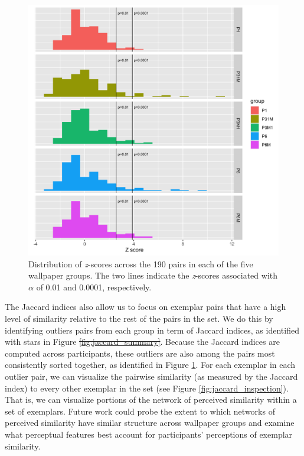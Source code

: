 \documentclass[11pt, twoside]{article}
\providecommand{\DIFaddtex}[1]{{\protect\color{blue}\uwave{#1}}} %
\providecommand{\DIFdeltex}[1]{{\protect\color{red}\sout{#1}}}                      %
\providecommand{\DIFaddbegin}{} %
\providecommand{\DIFaddend}{} %
\providecommand{\DIFdelbegin}{} %
\providecommand{\DIFdelend}{} %
\providecommand{\DIFadd}[1]{\texorpdfstring{\DIFaddtex{#1}}{#1}} %
\providecommand{\DIFdel}[1]{\texorpdfstring{\DIFdeltex{#1}}{}} %
\newcommand{\DIFscaledelfig}{0.5}
\newlength{\DIFdelgraphicswidth} %
\newlength{\DIFdelgraphicsheight} %
\newcommand{\DIFaddincludegraphics}[2][]{{\color{blue}\fbox{\DIFOincludegraphics[#1]{#2}}}} %
\newcommand{\DIFdelincludegraphics}[2][]{%
\sbox{\DIFdelgraphicsbox}{\DIFOincludegraphics[#1]{#2}}%
\settoboxwidth{\DIFdelgraphicswidth}{\DIFdelgraphicsbox} %
\settoboxtotalheight{\DIFdelgraphicsheight}{\DIFdelgraphicsbox} %
\scalebox{\DIFscaledelfig}{%
\parbox[b]{\DIFdelgraphicswidth}{\usebox{\DIFdelgraphicsbox}\\[-\baselineskip] \rule{\DIFdelgraphicswidth}{0em}}\llap{\resizebox{\DIFdelgraphicswidth}{\DIFdelgraphicsheight}{%
\setlength{\unitlength}{\DIFdelgraphicswidth}%
\begin{picture}(1,1)%
\thicklines\linethickness{2pt} %
{\color[rgb]{1,0,0}\put(0,0){\framebox(1,1){}}}%
{\color[rgb]{1,0,0}\put(0,0){\line( 1,1){1}}}%
{\color[rgb]{1,0,0}\put(0,1){\line(1,-1){1}}}%
\end{picture}%
}\hspace*{3pt}}} %
} %
\DeclareRobustCommand{\DIFaddbegin}{\DIFOaddbegin \let\includegraphics\DIFaddincludegraphics} %
\DeclareRobustCommand{\DIFaddend}{\DIFOaddend \let\includegraphics\DIFOincludegraphics} %
\DeclareRobustCommand{\DIFdelbegin}{\DIFOdelbegin \let\includegraphics\DIFdelincludegraphics} %
\DeclareRobustCommand{\DIFdelend}{\DIFOaddend \let\includegraphics\DIFOincludegraphics} %
\begin{document}
\begin{figure}[H]
	\centering
	\includegraphics[width=.85\linewidth]{./figures/jaccard_permutation.png}
	\caption{Distribution of \textit{z}-scores across the 190 pairs in each of the five wallpaper groups. The two lines indicate the \textit{z}-scores associated with $\alpha$ of 0.01 and 0.0001, respectively.}
	\label{fig:jaccard_permutation}
\end{figure}

The Jaccard indices also allow us to focus on exemplar pairs that have a high level of similarity relative to the rest of the pairs in the set. We do this by identifying outliers pairs from each group in term of Jaccard indices, as identified with stars in Figure \DIFdelbegin \DIFdel{\ref{fig:jaccard_summary}}\DIFdelend \DIFaddbegin \DIFadd{\ref{fig:n_sets_jaccard_summary}}\DIFaddend . Because the Jaccard indices are computed across participants, these outliers are also among the pairs most consistently sorted together, as identified in Figure \ref{fig:jaccard_permutation}. For each exemplar in each outlier pair, we can visualize the pairwise similarity (as measured by the Jaccard index) to every other exemplar in the set (see Figure \ref{fig:jaccard_inspection}). That is, we can visualize portions of the network of perceived similarity within a set of exemplars. Future work could probe the extent to which networks of perceived similarity have similar structure across wallpaper groups and examine what perceptual features best account for participants' perceptions of exemplar similarity.
\end{document}
